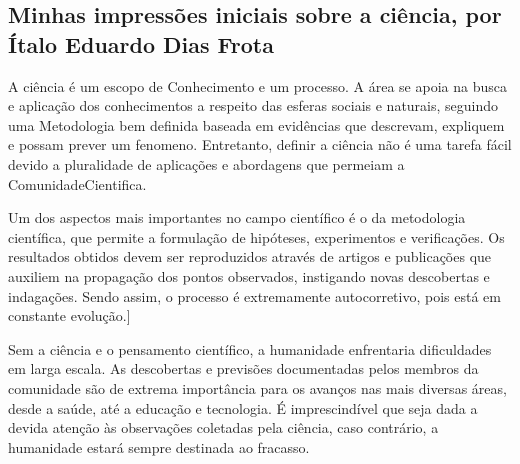 \subsection{Minhas impressões iniciais sobre a ciência, por Ítalo Eduardo Dias Frota}

A ciência é um escopo de \gls{Conhecimento} e um processo. A área se apoia na busca e aplicação dos conhecimentos a respeito das esferas sociais e naturais, seguindo uma \gls{Metodologia} bem definida baseada em evidências que descrevam, expliquem e possam prever um \gls{fenomeno}. Entretanto, definir a ciência não é uma tarefa fácil devido a pluralidade de aplicações e abordagens que permeiam a \gls{ComunidadeCientifica}.

Um dos aspectos mais importantes no campo científico é o da metodologia científica, que permite a formulação de hipóteses, experimentos  e verificações. Os resultados obtidos devem ser reproduzidos através de artigos e publicações que auxiliem na propagação dos pontos observados, instigando novas descobertas e indagações. Sendo assim, o processo é extremamente autocorretivo, pois está em constante evolução.]

Sem a ciência e o pensamento científico, a humanidade enfrentaria dificuldades em larga escala. As descobertas e previsões documentadas pelos membros da comunidade são de extrema importância para os avanços nas mais diversas áreas, desde a saúde, até a educação e tecnologia. É imprescindível que seja dada a devida atenção às observações coletadas pela ciência, caso contrário, a humanidade estará sempre destinada ao fracasso.
